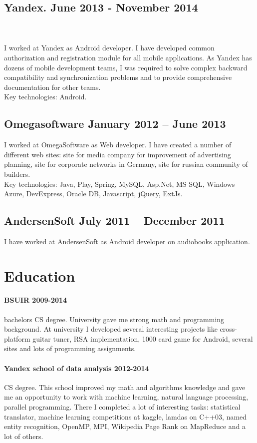 \documentclass{article}
\begin{document}
\subsection*{Yandex. June 2013 - November 2014}\\\\
I worked at Yandex as Android developer. I have developed common authorization and registration module for all mobile applications. As Yandex has dozens of mobile development teams, I was required to solve complex backward compatibility and synchronization problems and to provide comprehensive documentation for other teams.\\
Key technologies: Android.

\subsection*{Omegasoftware January 2012 – June 2013}
I worked at OmegaSoftware as Web developer. I have created a number of different web sites: site for media company for improvement of advertising planning, site for corporate networks in Germany, site for russian community of builders.\\
Key technologies: Java, Play, Spring, MySQL, Asp.Net, MS SQL, Windows Azure, DevExpress, Oracle DB, Javascript, jQuery, ExtJs.

\subsection*{AndersenSoft July 2011 – December 2011}
I have worked at AndersenSoft as Android developer on audiobooks application.

\section*{Education}
\paragraph{BSUIR 2009-2014} bachelors CS degree. University gave me strong math and programming background. At university I developed several interesting projects like cross-platform guitar tuner, RSA implementation, 1000 card game for Android, several sites and lots of programming assignments.
\paragraph{Yandex school of data analysis 2012-2014} CS degree. This school improved my math and algorithms knowledge and gave me an opportunity to work with machine learning, natural language processing, parallel programming. There I completed a lot of interesting tasks: statistical translator, machine learning competitions at kaggle, lamdas on C++03, named entity recognition, OpenMP, MPI, Wikipedia Page Rank on MapReduce and a lot of others.
\end{document}
